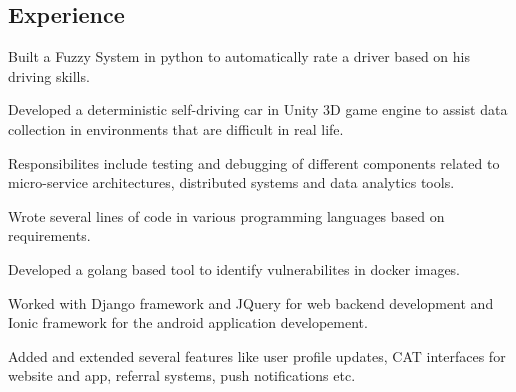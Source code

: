 \documentclass[letterpaper]{deedy-resume} %
\begin{document}
\begin{minipage}[t]{0.66\textwidth} %

\subsection{Experience}


\vspace{\topsep} %
\begin{tightitemize}
\item Built a Fuzzy System in python to automatically rate a driver based on his driving skills.
\item Developed a deterministic self-driving car in Unity 3D game engine to assist data collection in environments that are difficult in real life.
\end{tightitemize}

\sectionspace %



\begin{tightitemize}
\item Responsibilites include testing and debugging of different components related to micro-service architectures, distributed systems and data analytics tools.
\item Wrote several lines of code in various programming languages based on requirements.
\item Developed a golang based tool to identify vulnerabilites in docker images.
\end{tightitemize}

\sectionspace %



\begin{tightitemize}
\item Worked with Django framework and JQuery for web backend development and Ionic framework for the android application developement.
\item Added and extended several features like user profile updates, CAT interfaces for website and app, referral systems, push notifications etc.
\end{tightitemize}


\end{minipage}
\end{document}

